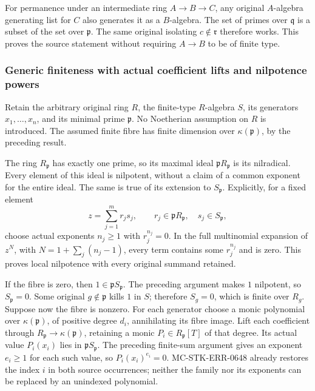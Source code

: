 For permanence under an intermediate ring \(A\to B\to C\), any original \(A\)-algebra generating list for \(C\) also generates it as a \(B\)-algebra. The set of primes over \(\mathfrak q\) is a subset of the set over \(\mathfrak p\). The same original isolating \(c\notin\mathfrak r\) therefore works. This proves the source statement without requiring \(A\to B\) to be of finite type.

\subsubsection{Generic finiteness with actual coefficient lifts and nilpotence powers}\label{algebra-proof-031-generic-finiteness-with-actual-coefficient-lifts-and-nilpotence-powers}

Retain the arbitrary original ring \(R\), the finite-type \(R\)-algebra \(S\), its generators \(x_1,\ldots,x_n\), and its minimal prime \(\mathfrak p\). No Noetherian assumption on \(R\) is introduced. The assumed finite fibre has finite dimension over \(\kappa(\mathfrak p)\), by the preceding result.

The ring \(R_{\mathfrak p}\) has exactly one prime, so its maximal ideal \(\mathfrak pR_{\mathfrak p}\) is its nilradical. Every element of this ideal is nilpotent, without a claim of a common exponent for the entire ideal. The same is true of its extension to \(S_{\mathfrak p}\). Explicitly, for a fixed element \[
 z=\sum_{j=1}^m r_js_j,\qquad
 r_j\in\mathfrak pR_{\mathfrak p},\quad s_j\in S_{\mathfrak p},
\] choose actual exponents \(n_j\ge1\) with \(r_j^{n_j}=0\). In the full multinomial expansion of \(z^N\), with \(N=1+\sum_j(n_j-1)\), every term contains some \(r_j^{n_j}\) and is zero. This proves local nilpotence with every original summand retained.

If the fibre is zero, then \(1\in\mathfrak pS_{\mathfrak p}\). The preceding argument makes \(1\) nilpotent, so \(S_{\mathfrak p}=0\). Some original \(g\notin\mathfrak p\) kills \(1\) in \(S\); therefore \(S_g=0\), which is finite over \(R_g\). Suppose now the fibre is nonzero. For each generator choose a monic polynomial over \(\kappa(\mathfrak p)\), of positive degree \(d_i\), annihilating its fibre image. Lift each coefficient through \(R_{\mathfrak p}\to\kappa(\mathfrak p)\), retaining a monic \(P_i\in R_{\mathfrak p}[T]\) of that degree. Its actual value \(P_i(x_i)\) lies in \(\mathfrak pS_{\mathfrak p}\). The preceding finite-sum argument gives an exponent \(e_i\ge1\) for each such value, so \(P_i(x_i)^{e_i}=0\). MC-\AlgebraIdentifierBreak{}STK-\AlgebraIdentifierBreak{}ERR-\AlgebraIdentifierBreak{}0648 already restores the index \(i\) in both source occurrences; neither the family nor its exponents can be replaced by an unindexed polynomial.

